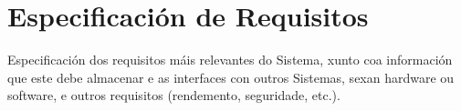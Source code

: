 \chapter{Especificación de Requisitos}

Especificación dos requisitos máis relevantes do Sistema, xunto coa información que este debe almacenar e as interfaces con outros Sistemas, sexan hardware ou software, e outros requisitos (rendemento, seguridade, etc.).
